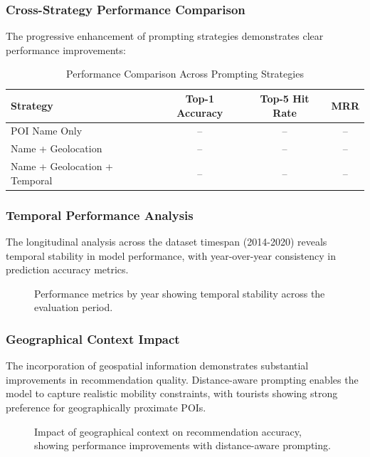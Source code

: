 \documentclass[12pt,a4paper]{article}
\begin{document}
\subsubsection{Cross-Strategy Performance Comparison}

The progressive enhancement of prompting strategies demonstrates clear performance improvements:

\begin{table}[h]
\centering
\caption{Performance Comparison Across Prompting Strategies}
\label{tab:strategy_comparison}
\begin{tabular}{lccc}
\toprule
\textbf{Strategy} & \textbf{Top-1 Accuracy} & \textbf{Top-5 Hit Rate} & \textbf{MRR} \\
\midrule
POI Name Only & -- & -- & -- \\
Name + Geolocation & -- & -- & -- \\
Name + Geolocation + Temporal & -- & -- & -- \\
\bottomrule
\end{tabular}
\end{table}

\subsubsection{Temporal Performance Analysis}

The longitudinal analysis across the dataset timespan (2014-2020) reveals temporal stability in model performance, with year-over-year consistency in prediction accuracy metrics.

\begin{figure}[h]
\centering
\caption{Performance metrics by year showing temporal stability across the evaluation period.}
\label{fig:temporal_performance}
\end{figure}

\subsubsection{Geographical Context Impact}

The incorporation of geospatial information demonstrates substantial improvements in recommendation quality. Distance-aware prompting enables the model to capture realistic mobility constraints, with tourists showing strong preference for geographically proximate POIs.

\begin{figure}[h]
\centering
\caption{Impact of geographical context on recommendation accuracy, showing performance improvements with distance-aware prompting.}
\label{fig:geographical_impact}
\end{figure}
\end{document}
